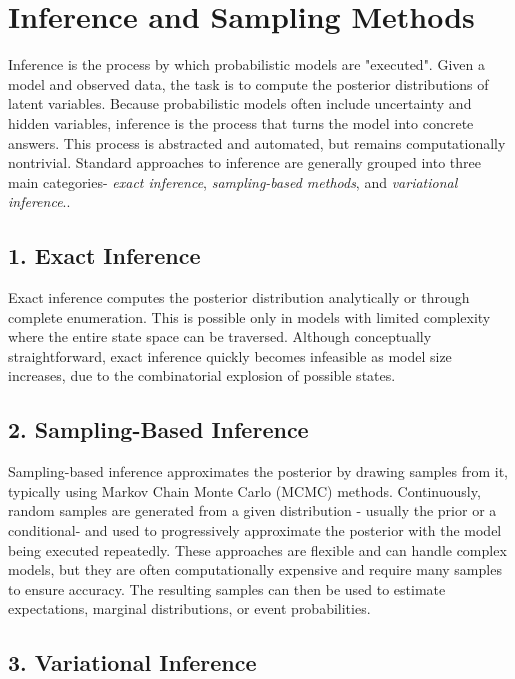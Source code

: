 \documentclass[11pt]{report}
\begin{document}
\section{Inference and Sampling Methods}

Inference is the process by which probabilistic models are "executed". Given a model and observed data, the task is to compute the posterior distributions of latent variables.
Because probabilistic models often include uncertainty and hidden variables, inference is the process that turns the model into concrete answers.
This process is abstracted and automated, but remains computationally nontrivial. Standard approaches to inference are generally grouped 
into three main categories- \textit{exact inference}, \textit{sampling-based methods}, and \textit{variational inference}.\cite{bishop2006prml, blei2017vi, goodman2014dippl}.

\subsection*{1. Exact Inference}

Exact inference computes the posterior distribution analytically or through complete enumeration. This is possible only in models with limited complexity where the 
entire state space can be traversed. Although conceptually straightforward, exact inference quickly becomes infeasible as model size increases, due to the combinatorial
explosion of possible states.

\subsection*{2. Sampling-Based Inference}

Sampling-based inference approximates the posterior by drawing samples from it, typically using Markov Chain Monte Carlo (MCMC) methods.
Continuously, random samples are generated from a given distribution - usually the prior or a conditional- and used to progressively approximate
the posterior with the model being executed repeatedly.
These approaches are flexible and can handle complex models, but they are often computationally expensive and require many samples to ensure accuracy.
The resulting samples can then be used to estimate expectations, marginal distributions, or event probabilities.

\subsection*{3. Variational Inference}
\end{document}
